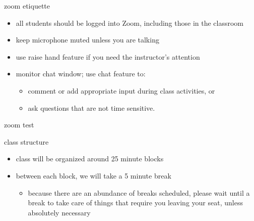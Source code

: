 \documentclass[10pt, t]{beamer}
\begin{document}
  \begin{frame}{zoom etiquette}
    \begin{itemize}
      \item all students should be logged into Zoom, including those in the
        classroom
      \item keep microphone muted unless you are talking
      \item use raise hand feature if you need the instructor's attention
      \item monitor chat window; use chat feature to:
        \begin{itemize}
          \item comment or add appropriate input during class activities, or
          \item ask questions that are not time sensitive.
        \end{itemize}
    \end{itemize}

  \end{frame}

  \begin{frame}[standout]
    zoom test

  \end{frame}

  \begin{frame}{class structure}
    \begin{itemize}
      \item class will be organized around 25 minute blocks
      \item between each block, we will take a 5 minute break
        \pause
        \begin{itemize}
          \item because there are an abundance of breaks scheduled, please wait
            until a break to take care of things that require you leaving your
            seat, unless absolutely necessary
        \end{itemize}
    \end{itemize}

  \end{frame}
\end{document}
